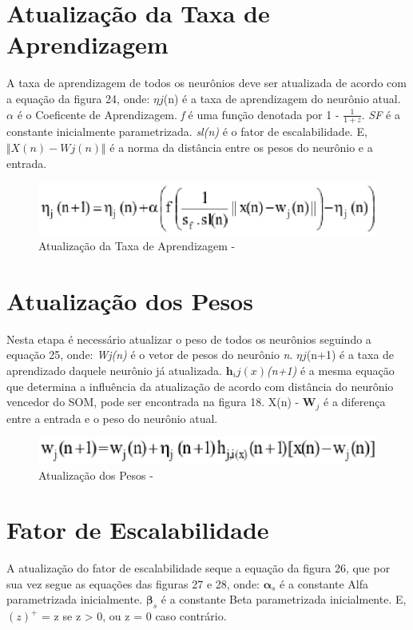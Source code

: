 \section{Atualização da Taxa de Aprendizagem}
A taxa de aprendizagem de todos os neurônios deve ser atualizada de acordo com a equação da figura 24, onde: $\eta j$(n) é a taxa de aprendizagem do neurônio atual. \textit{$\alpha$} é o Coeficente de Aprendizagem. \textit{f} é uma função denotada por 1 - $\frac{1}{1 + z}$. \textit{SF} é a constante inicialmente parametrizada. \textit{sl(n)} é o fator de escalabilidade. E, $\Vert X(n) - Wj(n)\Vert$ é a norma da distância entre os pesos do neurônio e a entrada. 

\begin{figure}[!h]
\centering
\includegraphics[keepaspectratio=true,scale=0.65]
{figuras/learn.eps}
\caption{Atualização da Taxa de Aprendizagem - }
\label{data_titatic}
\end{figure}

\section{Atualização dos Pesos}
Nesta etapa é necessário atualizar o peso de todos os neurônios seguindo a equação 25, onde: \textit{Wj(n)} é o vetor de pesos do neurônio \textit{n}. $\eta j$(n+1) é a taxa de aprendizado daquele neurônio já atualizada. \textit{$\mathbf{h}_ij(x)$(n+1)} é a mesma equação que determina a influência da atualização de acordo com distância do neurônio vencedor do SOM, pode ser encontrada na figura 18. X(n) - $\mathbf{W}_j$ é a diferença entre a entrada e o peso do neurônio atual.

\begin{figure}[!h]
\centering
\includegraphics[keepaspectratio=true,scale=0.65]
{figuras/synp.eps}
\caption{Atualização dos Pesos - }
\label{data_titatic}
\end{figure}


\section{Fator de Escalabilidade}
A atualização do fator de escalabilidade seque a equação da figura 26, que por sua vez segue as equações das figuras 27 e 28, onde: $\mathbf \alpha _s$ é a constante Alfa parametrizada inicialmente. $\mathbf \beta _s$ é a constante Beta parametrizada inicialmente. E, $(z)^+$ = z se z > 0, ou z = 0 caso contrário.

